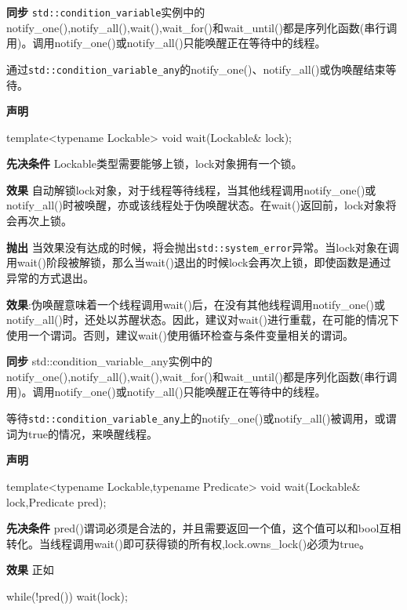 \textbf{同步}
\texttt{std::condition\_variable}实例中的notify\_one(),notify\_all(),wait(),wait\_for()和wait\_until()都是序列化函数(串行调用)。调用notify\_one()或notify\_all()只能唤醒正在等待中的线程。


通过\texttt{std::condition\_variable\_any}的notify\_one()、notify\_all()或伪唤醒结束等待。

\textbf{声明}

\begin{cpp}
template<typename Lockable>
void wait(Lockable& lock);
\end{cpp}

\textbf{先决条件}
Lockable类型需要能够上锁，lock对象拥有一个锁。

\textbf{效果}
自动解锁lock对象，对于线程等待线程，当其他线程调用notify\_one()或notify\_all()时被唤醒，亦或该线程处于伪唤醒状态。在wait()返回前，lock对象将会再次上锁。

\textbf{抛出}
当效果没有达成的时候，将会抛出\texttt{std::system\_error}异常。当lock对象在调用wait()阶段被解锁，那么当wait()退出的时候lock会再次上锁，即使函数是通过异常的方式退出。

\textbf{效果}:伪唤醒意味着一个线程调用wait()后，在没有其他线程调用notify\_one()或notify\_all()时，还处以苏醒状态。因此，建议对wait()进行重载，在可能的情况下使用一个谓词。否则，建议wait()使用循环检查与条件变量相关的谓词。

\textbf{同步}
std::condition\_variable\_any实例中的notify\_one(),notify\_all(),wait(),wait\_for()和wait\_until()都是序列化函数(串行调用)。调用notify\_one()或notify\_all()只能唤醒正在等待中的线程。


等待\texttt{std::condition\_variable\_any}上的notify\_one()或notify\_all()被调用，或谓词为true的情况，来唤醒线程。

\textbf{声明}

\begin{cpp}
template<typename Lockable,typename Predicate>
void wait(Lockable& lock,Predicate pred);
\end{cpp}

\textbf{先决条件}
pred()谓词必须是合法的，并且需要返回一个值，这个值可以和bool互相转化。当线程调用wait()即可获得锁的所有权,lock.owns\_lock()必须为true。

\textbf{效果}
正如

\begin{cpp}
while(!pred())
{
wait(lock);
}
\end{cpp}

